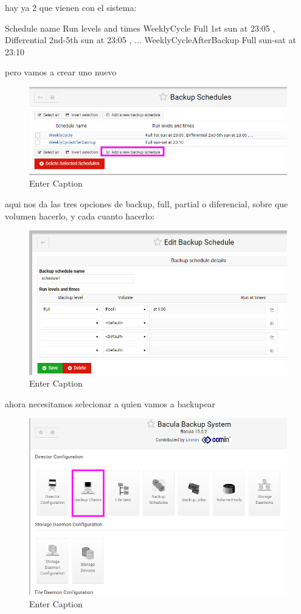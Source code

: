 hay ya 2 que vienen con el sistema:

Schedule name	Run levels and times
WeeklyCycle	Full 1st sun at 23:05 , Differential 2nd-5th sun at 23:05 , ...
WeeklyCycleAfterBackup	Full sun-sat at 23:10

pero vamos a crear uno nuevo

\begin{figure}[H]
    \centering
    \includegraphics[width=0.5\linewidth]{instalacionBacula/newBackupSchedules.png}
    \caption{Enter Caption}
\end{figure}

aqui nos da las tres opciones de backup, full, partial o diferencial, sobre que volumen hacerlo, y cada cuanto hacerlo:

\begin{figure}[H]
    \centering
    \includegraphics[width=0.5\linewidth]{instalacionBacula/editbuckupschedule.png}
    \caption{Enter Caption}
\end{figure}






ahora necesitamos selecionar a quien vamos a backupear
\begin{figure}[H]
    \centering
    \includegraphics[width=0.5\linewidth]{instalacionBacula/asdasdas.png}
    \caption{Enter Caption}
\end{figure}


